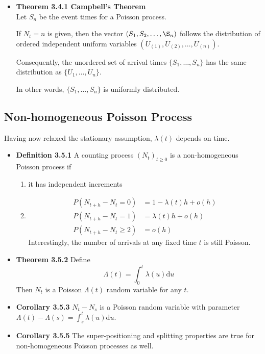 \documentclass[11pt,a4paper]{article}
\begin{document}
\begin{itemize}
    \item \textbf{Theorem 3.4.1 Campbell's Theorem} \\
        Let $S_n$ be the event times for a Poisson process.

        If $N_t = n$ is given, then the vector $(S_1, S_2, \ldots, \S_n)$
        follows the distribution of ordered independent uniform variables
        $(U_{(1)}, U_{(2)}, \ldots, U_{(n)})$.

        Consequently, the unordered set of arrival times
        $\{S_1, \ldots, S_n\}$ has the same distribution as $\{U_1, \ldots, U_n\}$.

        In other words, $\{S_1, \ldots, S_n\}$ is uniformly distributed.

\end{itemize}

\subsection{Non-homogeneous Poisson Process}

Having now relaxed the stationary assumption, $\lambda(t)$ depends on time.

\begin{itemize}
    \item \textbf{Definition 3.5.1}
        A counting process ${(N_t)}_{t\geq 0}$ is a non-homogeneous Poisson process if
        \begin{enumerate}
            \item it has independent increments
            \item
                \begin{align*}{}
                    P(N_{t+h} - N_t = 0)    & = 1 - \lambda(t)h + o(h) \\
                    P(N_{t+h} - N_t = 1)    & = \lambda(t)h + o(h) \\
                    P(N_{t+h} - N_t \geq 2) & = o(h)
                \end{align*}
                Interestingly, the number of arrivals at any fixed time $t$ is still Poisson.
        \end{enumerate}

    \item \textbf{Theorem 3.5.2}
        Define
        \[
            \Lambda(t) = \int_0^t \lambda(u) \mathrm{d}u
        \]
        Then $N_t$ is a Poisson $\Lambda(t)$ random variable for any $t$.

    \item \textbf{Corollary 3.5.3}
        $N_t - N_s$ is a Poisson random variable with parameter
        $\Lambda(t) - \Lambda(s) = \int_s^t \lambda(u) \mathrm{d}u$.

    \item \textbf{Corollary 3.5.5}
        The super-positioning and splitting properties are true for non-homogeneous
        Poisson processes as well.

\end{itemize}
\end{document}
